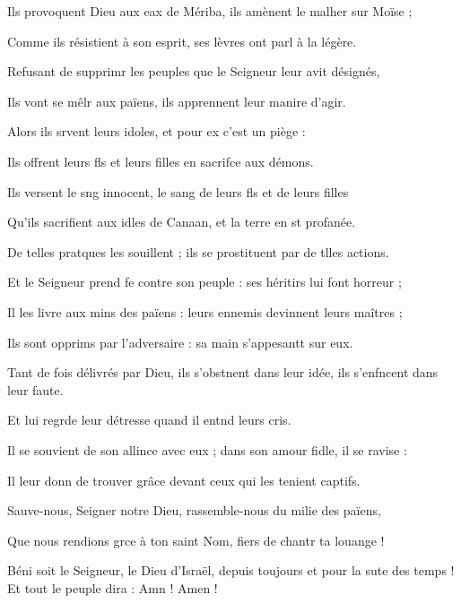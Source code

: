 \item Ils provoquent Dieu aux eax de Mériba,\psstar{} ils amènent le malher sur Moïse ;
\item Comme ils résistient à son esprit,\psstar{} ses lèvres ont parl à la légère.
\item Refusant de supprimr les peuples\psstar{} que le Seigneur leur avit désignés,
\item Ils vont se mêlr aux païens,\psstar{} ils apprennent leur manire d’agir.
\item Alors ils srvent leurs idoles,\psstar{} et pour ex c’est un piège :
\item Ils offrent leurs fls et leurs filles\psstar{} en sacrifce aux démons.
\item Ils versent le sng innocent,\psstar{} le sang de leurs fls et de leurs filles
\item Qu’ils sacrifient aux idles de Canaan,\psstar{} et la terre en st profanée.
\item De telles pratques les souillent ;\psstar{} ils se prostituent par de tlles actions.
\item Et le Seigneur prend fe contre son peuple :\psstar{} ses héritirs lui font horreur ;
\item Il les livre aux mins des païens :\psstar{} leurs ennemis devinnent leurs maîtres ;
\item Ils sont opprims par l’adversaire :\psstar{} sa main s’appesantt sur eux.
\item Tant de fois délivrés par Dieu,\pscross{} ils s’obstnent dans leur idée,\psstar{} ils s’enfncent dans leur faute.
\item Et lui regrde leur détresse\psstar{} quand il entnd leurs cris.
\item Il se souvient de son allince avec eux ;\psstar{} dans son amour fidle, il se ravise :
\item Il leur donn de trouver grâce\psstar{} devant ceux qui les tenient captifs.
\item Sauve-nous, Seigner notre Dieu,\psstar{} rassemble-nous du milie des païens, 
\item Que nous rendions grce à ton saint Nom,\psstar{} fiers de chantr ta louange !
\item Béni soit le Seigneur, le Dieu d’Israël,\pscross{} depuis toujours et pour la sute des temps !\psstar{} Et tout le peuple dira : Amn ! Amen !